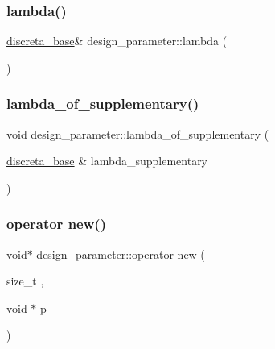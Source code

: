 \subsubsection{\texorpdfstring{lambda()}{lambda()}}
{\footnotesize\ttfamily \mbox{\hyperlink{classdiscreta__base}{discreta\+\_\+base}}\& design\+\_\+parameter\+::lambda (\begin{DoxyParamCaption}{ }\end{DoxyParamCaption})\hspace{0.3cm}{\ttfamily [inline]}}

\mbox{\label{classdesign__parameter_a377c987a2c470225466fd32a3e920f0a}} 
\subsubsection{\texorpdfstring{lambda\+\_\+of\+\_\+supplementary()}{lambda\_of\_supplementary()}}
{\footnotesize\ttfamily void design\+\_\+parameter\+::lambda\+\_\+of\+\_\+supplementary (\begin{DoxyParamCaption}\item[{\mbox{\hyperlink{classdiscreta__base}{discreta\+\_\+base}} \&}]{lambda\+\_\+supplementary }\end{DoxyParamCaption})}

\mbox{\label{classdesign__parameter_a3a494f1e4e845ee4c70889675cfbce24}} 
\subsubsection{\texorpdfstring{operator new()}{operator new()}}
{\footnotesize\ttfamily void$\ast$ design\+\_\+parameter\+::operator new (\begin{DoxyParamCaption}\item[{size\+\_\+t}]{,  }\item[{void $\ast$}]{p }\end{DoxyParamCaption})\hspace{0.3cm}{\ttfamily [inline]}}

